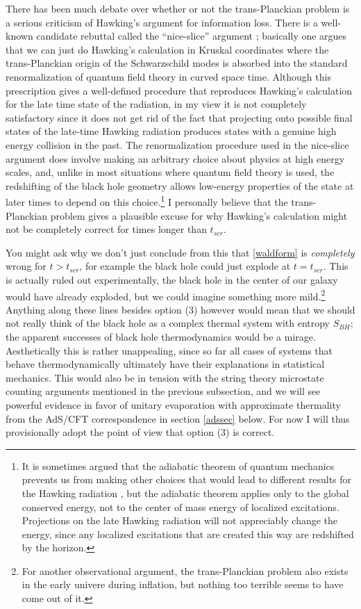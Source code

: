 \documentclass[12pt]{article}
\begin{document}
There has been much debate over whether or not the trans-Planckian problem is a serious criticism of Hawking's argument for information loss.  There is a well-known candidate rebuttal called the ``nice-slice'' argument \cite{Polchinski:1995ta}; basically one argues that we can just do Hawking's calculation in Kruskal coordinates where the trans-Planckian origin of the Schwarzschild modes is absorbed into the standard renormalization of quantum field theory in curved space time.  Although this prescription gives a well-defined procedure that reproduces Hawking's calculation for the late time state of the radiation, in my view it is not completely satisfactory since it does not get rid of the fact that projecting onto possible final states of the late-time Hawking radiation produces states with a genuine high energy collision in the past. The renormalization procedure used in the nice-slice argument does involve making an arbitrary choice about physics at high energy scales, and, unlike in most situations where quantum field theory is used, the redshifting of the black hole geometry allows low-energy properties of the state at later times to depend on this choice.\footnote{It is sometimes argued that the adiabatic theorem of quantum mechanics prevents us from making other choices that would lead to different results for the Hawking radiation \cite{Polchinski:1995ta}, but the adiabatic theorem applies only to the global conserved energy, not to the center of mass energy of localized excitations.  Projections on the late Hawking radiation will not appreciably change the energy, since any localized excitations that are created this way are redshifted by the horizon.}  I personally believe that the trans-Planckian problem gives a plausible excuse for why Hawking's calculation might not be completely correct for times longer than $t_{scr}$.  

You might ask why we don't just conclude from this that \eqref{waldform} is \textit{completely} wrong for $t>t_{scr}$, for example the black hole could just explode at $t=t_{scr}$.  This is actually ruled out experimentally, the black hole in the center of our galaxy would have already exploded, but we could imagine something more mild.\footnote{For another observational argument, the trans-Planckian problem also exists in the early univere during inflation, but nothing too terrible seems to have come out of it.}  Anything along these lines besides option (3) however would mean that we should not really think of the black hole as a complex thermal system with entropy $S_{BH}$; the apparent successes of black hole thermodynamics would be a mirage.  Aesthetically this is rather unappealing, since so far all cases of systems that behave thermodynamically ultimately have their explanations in statistical mechanics.  This would also be in tension with the string theory microstate counting arguments mentioned in the previous subsection, and we will see powerful evidence in favor of unitary evaporation with approximate thermality from the AdS/CFT correspondence in section \eqref{adssec} below.  For now I will thus provisionally adopt the point of view that option (3) is correct.  
 
\end{document}

